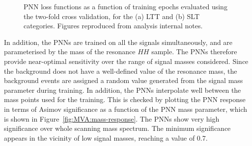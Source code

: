 \begin{figure}
  \centering
  \quad
  \quad
  \caption{PNN loss functions as a function of training epochs evaluated 
  using the two-fold cross validation, for the (a) LTT and (b) SLT categories.
  Figures reproduced from analysis internal notes. }
  \label{fig:overtrainingtestpnn}
\end{figure}



In addition, the PNNs are trained on all the signals simultaneously, 
and are parameterised by the mass of the resonance $HH$ sample. 
The PNNs therefore provide near-optimal sensitivity over the
range of signal masses considered. 
Since the background does not have a well-defined value of the
resonance mass, the background events are assigned a random value
generated from the signal mass parameter during training. 
In addition, the PNNs interpolate well between the mass points used for the training.
This is checked by plotting the PNN response in terms of Asimov significance
as a function of the PNN mass parameter, which is shown in Figure~\ref{fig:MVA:mass-response}. 
The PNNs show very high significance over whole scanning mass spectrum. 
The minimum significance appears in the vicinity of low signal masses, reaching a 
value of 0.7. 



